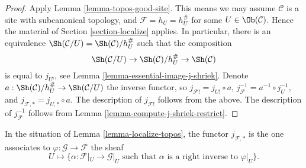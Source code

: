 \begin{proof}
Apply
Lemma \ref{lemma-topos-good-site}.
This means we may assume $\mathcal{C}$ is a site
with subcanonical topology, and $\mathcal{F} = h_U = h_U^\#$
for some $U \in \Ob(\mathcal{C})$.
Hence the material of
Section \ref{section-localize}
applies. In particular, there is an equivalence
$\Sh(\mathcal{C}/U) = \Sh(\mathcal{C})/h_U^\#$
such that the composition
$$
\Sh(\mathcal{C}/U)
\to
\Sh(\mathcal{C})/h_U^\#
\to \Sh(\mathcal{C})
$$
is equal to $j_{U!}$, see
Lemma \ref{lemma-essential-image-j-shriek}.
Denote
$a : \Sh(\mathcal{C})/h_U^\# \to \Sh(\mathcal{C}/U)$
the inverse functor, so $j_{\mathcal{F}!} = j_{U!} \circ a$,
$j_\mathcal{F}^{-1} = a^{-1} \circ j_U^{-1}$, and
$j_{\mathcal{F}, *} = j_{U, *} \circ a$. The description of
$j_{\mathcal{F}!}$ follows from the above. The description of
$j_\mathcal{F}^{-1}$ follows from
Lemma \ref{lemma-compute-j-shriek-restrict}.
\end{proof}

\begin{lemma}
\label{lemma-localize-pushforward}
In the situation of Lemma \ref{lemma-localize-topos}, the functor
$j_{\mathcal{F}, *}$ is the one associates to
$\varphi : \mathcal{G} \to \mathcal{F}$ the sheaf
$$
U
\longmapsto
\{\alpha : \mathcal{F}|_U \to \mathcal{G}|_U
\text{ such that } \alpha \text{ is a right inverse to }\varphi|_U \}.
$$
\end{lemma}

